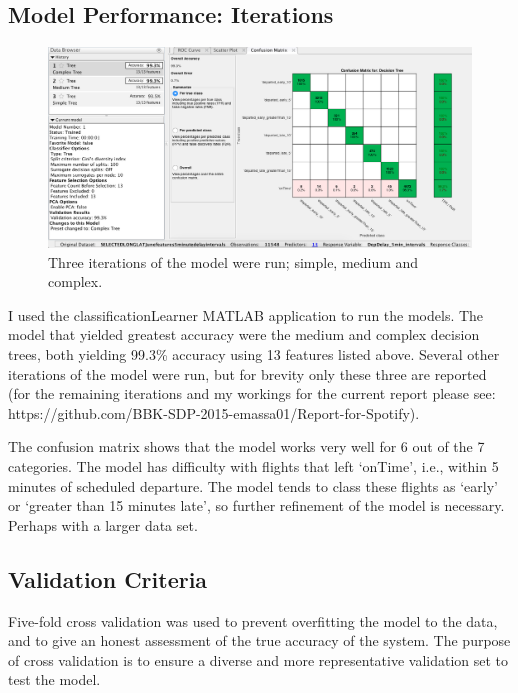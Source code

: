 \documentclass[a4paper, 10pt]{article}
\begin{document}
\subsection{Model Performance: Iterations}

\begin{figure}[H]
\begin{center}
\includegraphics[scale=0.3]{3models}
\caption{Three iterations of the model were run; simple, medium and complex.}
\label{3models}
\end{center}
\end{figure}


I used the classificationLearner MATLAB application to run the models. The model that yielded greatest accuracy were the medium and complex decision trees, both yielding 99.3\% accuracy using 13 features listed above. Several other iterations of the model were run, but for brevity only these three are reported (for the remaining iterations and my workings for the current report please see: https://github.com/BBK-SDP-2015-emassa01/Report-for-Spotify).

\vspace{5mm}
The confusion matrix shows that the model works very well for 6 out of the 7 categories. The model has difficulty with flights that left `onTime', i.e., within 5 minutes of scheduled departure. The model tends to class these flights as `early' or `greater than 15 minutes late', so further refinement of the model is necessary. Perhaps with a larger data set.

\subsection{Validation Criteria}
Five-fold cross validation was used to prevent overfitting the model to the data, and to give an honest assessment of the true accuracy of the system. The purpose of cross validation is to ensure a diverse and more representative validation set to test the model. 
\end{document}
